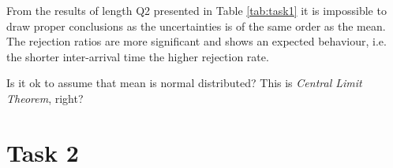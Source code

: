 \documentclass[]{article}
\begin{document}
From the results of length Q2 presented in Table \ref{tab:task1} it is impossible to draw proper conclusions as the uncertainties is of the same order as the mean. The rejection ratios are more significant and shows an expected behaviour, i.e. the shorter inter-arrival time the higher rejection rate.

Is it ok to assume that mean is normal distributed? This is {\it Central Limit Theorem}, right?

\section{Task 2}
\end{document}
